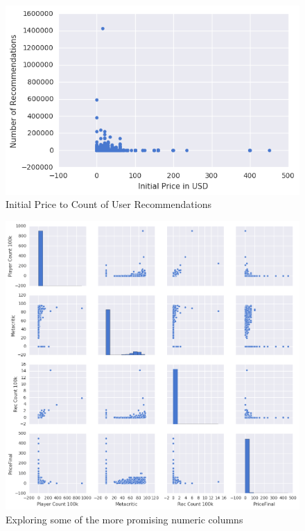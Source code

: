 \documentclass[10pt,journal,compsoc]{IEEEtran}
\begin{document}
\begin{figure}[p]
    \caption{Initial Price to Count of User Recommendations \label{fig:price-recommendations-all}}
    \includegraphics[width=\textwidth,keepaspectratio]{price-recommendations-scatter-all}
\end{figure}

\begin{figure}[p]
    \caption{Exploring some of the more promising numeric columns \label{fig:numeric-explorations}}
    \includegraphics[width=\textwidth,keepaspectratio]{numeric-exploration}
\end{figure}
\end{document}
